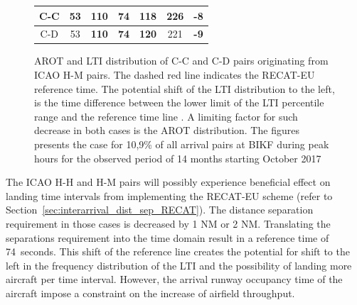 \begin{figure}[h]
{{\begin{tabular}{c|c|c|c|c|c|c|}
    \multicolumn{1}{|c|}{C-C} & \cellcolor[HTML]{ffedcc}53 & \cellcolor[HTML]{ffedcc}\textbf{110} & {\color[HTML]{9a0000} \textbf{74}} & \cellcolor[HTML]{cce5e5}\textbf{118} & \cellcolor[HTML]{cce5e5}226 & \cellcolor[HTML]{9AFF99}\textbf{-8} \\ \hline
    \multicolumn{1}{|c|}{C-D} & \cellcolor[HTML]{ffedcc}53 & \cellcolor[HTML]{ffedcc}\textbf{110} & {\color[HTML]{9a0000} \textbf{74}} & \cellcolor[HTML]{cce5e5}\textbf{120} & \cellcolor[HTML]{cce5e5}221 &  \cellcolor[HTML]{9AFF99}\textbf{-9} \\ \hline
    \end{tabular}%
    }\label{tablehm}}
    
    \caption[AROT and LTI of C-C and C-D pairs originating from ICAO H-M pairs]{AROT and LTI distribution of \protect{} C-C and \protect{} C-D pairs originating from ICAO H-M pairs. The dashed red line indicates the RECAT-EU reference time. The potential shift of the LTI distribution to the left, is the time difference between the lower limit of the LTI percentile range and the reference time line \protect{}. A limiting factor for such decrease in both cases is the AROT distribution. The figures presents the case for 10,9\% of all arrival pairs at BIKF during peak hours for the observed period of 14 months starting October 2017}\label{whole_figureHM}
\end{figure}


The ICAO H-H and H-M pairs will possibly experience beneficial effect on landing time intervals from implementing the RECAT-EU scheme (refer to Section~\ref{sec:interarrival_dist_sep_RECAT}). The distance separation requirement in those cases is decreased by 1 NM or 2 NM. Translating the separations requirement into the time domain result in a reference time of 74~seconds. This shift of the reference line creates the potential for shift to the left in the frequency distribution of the LTI and the possibility of landing more aircraft per time interval. However, the arrival runway occupancy time of the aircraft impose a constraint on the increase of airfield throughput.
 

